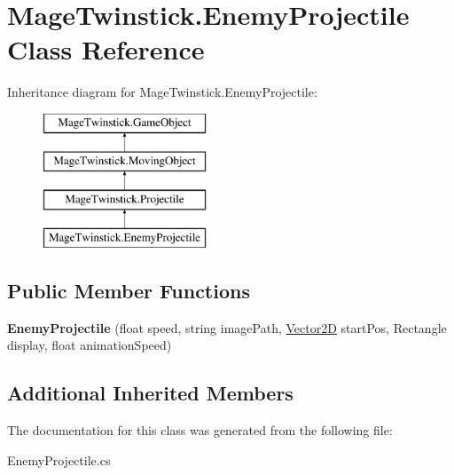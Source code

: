 \hypertarget{class_mage_twinstick_1_1_enemy_projectile}{}\section{Mage\+Twinstick.\+Enemy\+Projectile Class Reference}
\label{class_mage_twinstick_1_1_enemy_projectile}
Inheritance diagram for Mage\+Twinstick.\+Enemy\+Projectile\+:\begin{figure}[H]
\begin{center}
\leavevmode
\includegraphics[height=4.000000cm]{class_mage_twinstick_1_1_enemy_projectile}
\end{center}
\end{figure}
\subsection*{Public Member Functions}
\begin{DoxyCompactItemize}
\item 
\hypertarget{class_mage_twinstick_1_1_enemy_projectile_aeddaa709304e1f22c45c82202b385352}{}{\bfseries Enemy\+Projectile} (float speed, string image\+Path, \hyperlink{class_mage_twinstick_1_1_vector2_d}{Vector2\+D} start\+Pos, Rectangle display, float animation\+Speed)\label{class_mage_twinstick_1_1_enemy_projectile_aeddaa709304e1f22c45c82202b385352}

\end{DoxyCompactItemize}
\subsection*{Additional Inherited Members}


The documentation for this class was generated from the following file\+:\begin{DoxyCompactItemize}
\item 
Enemy\+Projectile.\+cs\end{DoxyCompactItemize}
